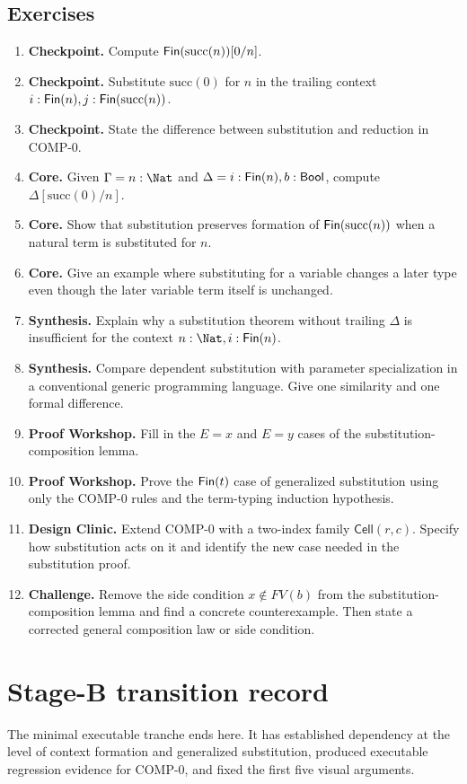 \documentclass[11pt,openany]{book}
\begin{document}
\section{Exercises}

\begin{enumerate}[label=\textbf{2.\arabic*.}]
\item \textbf{Checkpoint.} Compute $\mathsf{Fin}(\mathrm{succ}(n))[0/n]$.
\item \textbf{Checkpoint.} Substitute $\mathrm{succ}(0)$ for $n$ in the trailing context $i:\mathsf{Fin}(n),j:\mathsf{Fin}(\mathrm{succ}(n))$.
\item \textbf{Checkpoint.} State the difference between substitution and reduction in COMP-0.
\item \textbf{Core.} Given $\Gamma=n:\Nat$ and $\Delta=i:\mathsf{Fin}(n),b:\mathsf{Bool}$, compute $\Delta[\mathrm{succ}(0)/n]$.
\item \textbf{Core.} Show that substitution preserves formation of $\mathsf{Fin}(\mathrm{succ}(n))$ when a natural term is substituted for $n$.
\item \textbf{Core.} Give an example where substituting for a variable changes a later type even though the later variable term itself is unchanged.
\item \textbf{Synthesis.} Explain why a substitution theorem without trailing $\Delta$ is insufficient for the context $n:\Nat,i:\Fin(n)$.
\item \textbf{Synthesis.} Compare dependent substitution with parameter specialization in a conventional generic programming language. Give one similarity and one formal difference.
\item \textbf{Proof Workshop.} Fill in the $E=x$ and $E=y$ cases of the substitution-composition lemma.
\item \textbf{Proof Workshop.} Prove the $\mathsf{Fin}(t)$ case of generalized substitution using only the COMP-0 rules and the term-typing induction hypothesis.
\item \textbf{Design Clinic.} Extend COMP-0 with a two-index family $\mathsf{Cell}(r,c)$. Specify how substitution acts on it and identify the new case needed in the substitution proof.
\item \textbf{Challenge.} Remove the side condition $x\notin FV(b)$ from the substitution-composition lemma and find a concrete counterexample. Then state a corrected general composition law or side condition.
\end{enumerate}

\backmatter
\chapter*{Stage-B transition record}
The minimal executable tranche ends here. It has established dependency at the level of context formation and generalized substitution, produced executable regression evidence for COMP-0, and fixed the first five visual arguments.
\end{document}
